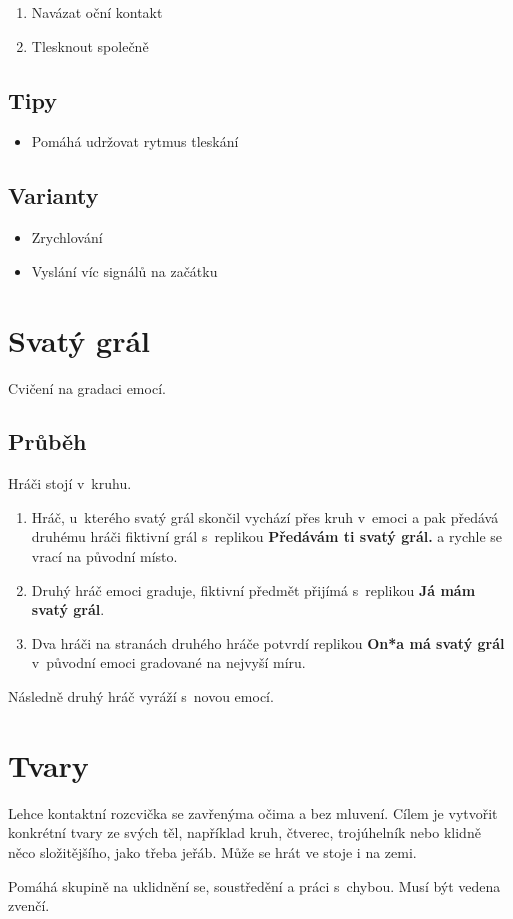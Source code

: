 \begin{enumerate}
\item   Navázat oční kontakt
\item   Tlesknout společně
\end{enumerate}
 
\subsection{ Tipy }  
\begin{itemize}
\item  Pomáhá udržovat rytmus tleskání
\end{itemize}
 
\subsection{ Varianty }  
\begin{itemize}
\item  Zrychlování
\item  Vyslání víc signálů na začátku
\end{itemize}
 
 
 
 
\needspace{5cm} \section{Svatý grál} \label{svatý grál} Cvičení na gradaci emocí. 
\subsection{ Průběh } Hráči stojí v~kruhu.  
 
\begin{enumerate}
\item  Hráč, u~kterého svatý grál skončil vychází přes kruh v~emoci a pak předává druhému hráči fiktivní grál s~replikou \textbf{Předávám ti svatý grál.} a rychle se vrací na původní místo.
\item  Druhý hráč emoci graduje, fiktivní předmět přijímá s~replikou \textbf{Já mám svatý grál}.
\item  Dva hráči  na stranách druhého hráče potvrdí replikou \textbf{On*a má svatý grál} v~původní emoci gradované na nejvyší míru.
\end{enumerate}
 
Následně druhý hráč vyráží s~novou emocí.  
 
 
 
\needspace{5cm} \section{Tvary} \label{tvary} Lehce kontaktní rozcvička se zavřenýma očima a bez mluvení. Cílem je vytvořit konkrétní tvary ze svých těl, například kruh, čtverec, trojúhelník nebo klidně něco složitějšího, jako třeba jeřáb. Může se hrát ve stoje i na zemi. 
 
Pomáhá skupině na uklidnění se, soustředění a práci s~chybou. Musí být vedena zvenčí. 
 
 
 
 
 
 
